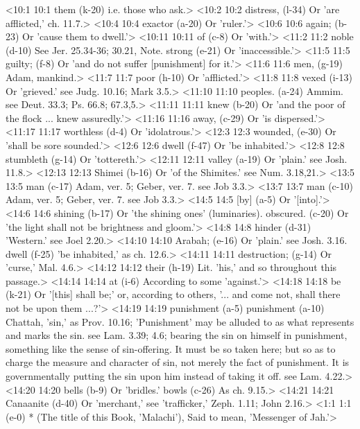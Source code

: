 <10:1 10:1  them (k-20)  i.e. those who ask.>
<10:2 10:2  distress, (l-34)  Or 'are afflicted,' ch. 11.7.>
<10:4 10:4  exactor (a-20)  Or 'ruler.'>
<10:6 10:6  again; (b-23)  Or 'cause them to dwell.'>
<10:11 10:11  of (c-8)  Or 'with.'>
<11:2 11:2  noble (d-10)  See Jer. 25.34-36; 30.21, Note.
  strong (e-21)  Or 'inaccessible.'>
<11:5 11:5  guilty; (f-8)  Or 'and do not suffer [punishment] for it.'>
<11:6 11:6  men, (g-19)  Adam, mankind.>
<11:7 11:7  poor (h-10)  Or 'afflicted.'>
<11:8 11:8  vexed (i-13)  Or 'grieved.' see Judg. 10.16; Mark 3.5.>
<11:10 11:10  peoples. (a-24)  Ammim. see Deut. 33.3; Ps. 66.8; 67.3,5.>
<11:11 11:11  knew (b-20)  Or 'and the poor of the flock ... knew assuredly.'>
<11:16 11:16  away, (c-29)  Or 'is dispersed.'>
<11:17 11:17  worthless (d-4)  Or 'idolatrous.'>
<12:3 12:3  wounded, (e-30)  Or 'shall be sore sounded.'>
<12:6 12:6  dwell (f-47)  Or 'be inhabited.'>
<12:8 12:8  stumbleth (g-14)  Or 'tottereth.'>
<12:11 12:11  valley (a-19)  Or 'plain.' see Josh. 11.8.>
<12:13 12:13  Shimei (b-16)  Or 'of the Shimites.' see Num. 3.18,21.>
<13:5 13:5  man (c-17)  Adam, ver. 5; Geber, ver. 7. see Job 3.3.>
<13:7 13:7  man (c-10)  Adam, ver. 5; Geber, ver. 7. see Job 3.3.>
<14:5 14:5  [by] (a-5)  Or '[into].'>
<14:6 14:6  shining (b-17)  Or 'the shining ones' (luminaries).
  obscured. (c-20)  Or 'the light shall not be brightness and gloom.'>
<14:8 14:8  hinder (d-31)  'Western.' see Joel 2.20.>
<14:10 14:10  Arabah; (e-16)  Or 'plain.' see Josh. 3.16.
  dwell (f-25)  'be inhabited,' as ch. 12.6.>
<14:11 14:11  destruction; (g-14)  Or 'curse,' Mal. 4.6.>
<14:12 14:12  their (h-19)  Lit. 'his,' and so throughout this passage.>
<14:14 14:14  at (i-6)  According to some 'against.'>
<14:18 14:18  be (k-21)  Or '[this] shall be;' or, according to others, '... and come  not, shall there not be upon them ...?'>
<14:19 14:19  punishment (a-5)  punishment (a-10)
  Chattah, 'sin,' as Prov. 10.16; 'Punishment' may be alluded  to as what represents and marks the sin. see Lam. 3.39; 4.6;  bearing the sin on himself in punishment, something like the  sense of sin-offering. It must be so taken here; but so as to  charge the measure and character of sin, not merely the fact of  punishment. It is governmentally putting the sin upon him  instead of taking it off. see Lam. 4.22.>
<14:20 14:20  bells (b-9)  Or 'bridles.'
  bowls (c-26)  As ch. 9.15.>
<14:21 14:21  Canaanite (d-40)  Or 'merchant,' see 'trafficker,' Zeph. 1.11; John 2.16.>
<1:1 1:1   (e-0)  * (The title of this Book, 'Malachi'), Said to mean,  'Messenger of Jah.'>
